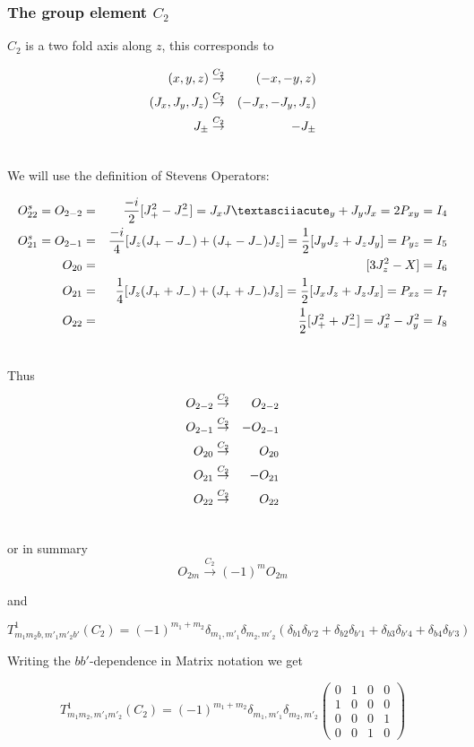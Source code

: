 
\subsubsection{The group element $C_2$}

$C_2$ is a two fold axis along $z$, this corresponds to 

\begin{eqnarray}
(x,y,z) &\stackrel{C_2}{\rightarrow}& (-x,-y,z) \\ \nonumber
(J_x,J_y,J_z) &\stackrel{C_2}{\rightarrow}&  (-J_x,-J_y,J_z) \\ \nonumber
J_\pm &\stackrel{C_2}{\rightarrow}& - J_\pm \\ \nonumber
\end{eqnarray}

We will use the definition of Stevens Operators:

\begin{eqnarray}
O^s_{22}=O_{2-2}&=&\frac{-i}{2}[J_+^2-J_-^2]=J_xJ´_y+J_yJ_x=2P_{xy}=I_4 \nn
O^s_{21}=O_{2-1}&=&\frac{-i}{4}[J_z(J_+-J_-)+(J_+-J_-)J_z]=\frac{1}{2}[J_yJ_z+J_zJ_y]=P_{yz}=I_5 \nn
O_{20}&=&[3J_z^2-X]=I_6 \nn
O_{21}&=&\frac{1}{4}[J_z(J_++J_-)+(J_++J_-)J_z]=\frac{1}{2}[J_xJ_z+J_zJ_x]=P_{xz}=I_7 \nn
O_{22}&=&\frac{1}{2}[J_+^2+J_-^2]=J_x^2-J_y^2 =I_8\nn
\end{eqnarray}

Thus 
\begin{eqnarray}
O_{2-2}&\stackrel{C_2}{\rightarrow}&O_{2-2} \\ \nonumber
O_{2-1}&\stackrel{C_2}{\rightarrow}&-O_{2-1} \\ \nonumber
O_{20}&\stackrel{C_2}{\rightarrow}&O_{20} \\ \nonumber
O_{21}&\stackrel{C_2}{\rightarrow}&-O_{21}\\ \nonumber
O_{22}&\stackrel{C_2}{\rightarrow}&O_{22}\\ \nonumber
\end{eqnarray}

or in summary
\begin{equation}
O_{2m}\stackrel{C_2}{\rightarrow} (-1)^m O_{2m} 
\end{equation}

and 

\begin{equation}
T^1_{m_1m_2b,m'_1m'_2b'}(C_2)=(-1)^{m_1+m_2}\delta_{m_1,m'_1}\delta_{m_2,m'_2}
(\delta_{b1}\delta_{b'2}+\delta_{b2}\delta_{b'1}+\delta_{b3}\delta_{b'4}+\delta_{b4}\delta_{b'3})
\end{equation}

Writing the $bb'$-dependence in Matrix notation we get

\begin{equation}\label{C2}
T^1_{m_1m_2,m'_1m'_2}(C_2)=(-1)^{m_1+m_2}\delta_{m_1,m'_1}\delta_{m_2,m'_2}
\left (
\begin{array}{cccc}
0 & 1 & 0 & 0 \\
1 & 0 & 0 & 0 \\
0 & 0 & 0 & 1 \\
0 & 0 & 1 & 0 
\end{array} \right )
\end{equation}

